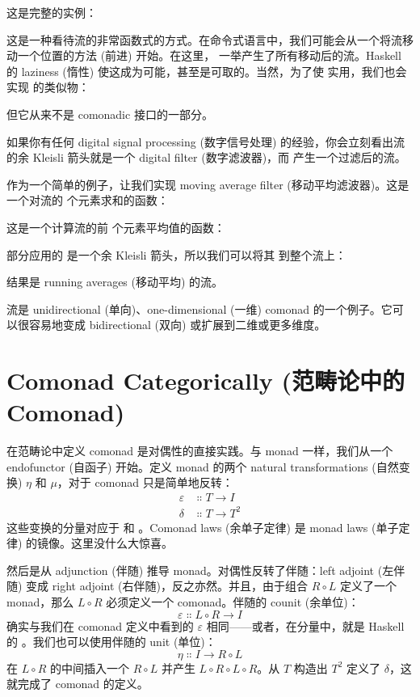 这是完整的实例：

这是一种看待流的非常函数式的方式。在命令式语言中，我们可能会从一个将流移动一个位置的方法  (前进) 开始。在这里， 一举产生了所有移动后的流。Haskell 的 laziness (惰性) 使这成为可能，甚至是可取的。当然，为了使  实用，我们也会实现  的类似物：

但它从来不是 comonadic 接口的一部分。

如果你有任何 digital signal processing (数字信号处理) 的经验，你会立刻看出流的余 Kleisli 箭头就是一个 digital filter (数字滤波器)，而  产生一个过滤后的流。

作为一个简单的例子，让我们实现 moving average filter (移动平均滤波器)。这是一个对流的  个元素求和的函数：

这是一个计算流的前  个元素平均值的函数：

部分应用的  是一个余 Kleisli 箭头，所以我们可以将其  到整个流上：

结果是 running averages (移动平均) 的流。

流是 unidirectional (单向)、one-dimensional (一维) comonad 的一个例子。它可以很容易地变成 bidirectional (双向) 或扩展到二维或更多维度。

\section{Comonad Categorically (范畴论中的 Comonad)}

在范畴论中定义 comonad 是对偶性的直接实践。与 monad 一样，我们从一个 endofunctor (自函子)  开始。定义 monad 的两个 natural transformations (自然变换) $\eta$ 和 $\mu$，对于 comonad 只是简单地反转：
\begin{align*}
  \varepsilon & \Colon T \to I   \\
  \delta      & \Colon T \to T^2
\end{align*}
这些变换的分量对应于  和 。Comonad laws (余单子定律) 是 monad laws (单子定律) 的镜像。这里没什么大惊喜。

然后是从 adjunction (伴随) 推导 monad。对偶性反转了伴随：left adjoint (左伴随) 变成 right adjoint (右伴随)，反之亦然。并且，由于组合 $R \circ L$ 定义了一个 monad，那么 $L \circ R$ 必须定义一个 comonad。伴随的 counit (余单位)：
\[\varepsilon \Colon L \circ R \to I\]
确实与我们在 comonad 定义中看到的 $\varepsilon$ 相同——或者，在分量中，就是 Haskell 的 。我们也可以使用伴随的 unit (单位)：
\[\eta \Colon I \to R \circ L\]
在 $L \circ R$ 的中间插入一个 $R \circ L$ 并产生 $L \circ R \circ L \circ R$。从 $T$ 构造出 $T^2$ 定义了 $\delta$，这就完成了 comonad 的定义。

